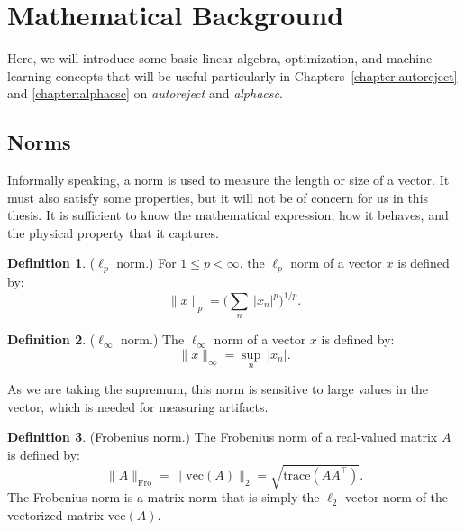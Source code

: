 
\section{Mathematical Background}

Here, we will introduce some basic linear algebra, optimization, and machine learning concepts that will be useful particularly in Chapters~\ref{chapter:autoreject} and \ref{chapter:alphacsc} on \emph{autoreject} and \emph{alphacsc}.

\subsection{Norms}
Informally speaking, a norm is used to measure the length or size of a vector. It must also satisfy some properties, but it will not be of concern for us in this thesis. It is sufficient to know the mathematical expression, how it behaves, and the physical property that it captures.
\theoremstyle{definition}
\newtheorem{definition}{Definition}[chapter]
%
%
\vspace{\parskip}
\begin{definition}{($\ell_p$ norm.)}
For $1 \leq p < \infty$, the $\ell_p$ norm of a vector $x$ is defined by:
\begin{equation}
\|x\|_p = \Big(\sum_n \ \lvert x_n \rvert^p \Big)^{1/p}.
\end{equation}
\end{definition}
%
%
\vspace{\parskip}
\begin{definition}{($\ell_\infty$ norm.)}
The $\ell_\infty$ norm of a vector $x$ is defined by:
\begin{equation}
\|x\|_{\infty} = \sup_n \ \lvert x_n \rvert.
\end{equation}
\label{def:norm}
\end{definition}
As we are taking the supremum, this norm is sensitive to large values in the vector, which is needed for measuring artifacts.
%
%
\vspace{\parskip}
\begin{definition}{(Frobenius norm.)}
The Frobenius norm of a real-valued matrix $A$ is defined by:
\begin{equation}
\|A\|_{\mathrm{Fro}} = \| \mathrm{vec}(A) \|_2 = \sqrt{\mathrm{trace}(AA^\top)}.
\end{equation}
%
The Frobenius norm is a matrix norm that is simply the $\ell_2$ vector norm of the vectorized matrix $\mathrm{vec}(A)$.

\end{definition}

